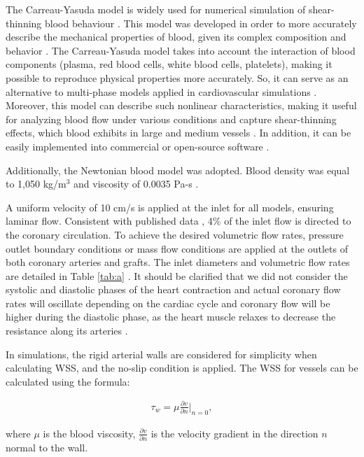 ﻿\documentclass[12pt,a4paper]{article}
\theoremstyle{definition}
\numberwithin{equation}{section}
\begin{document}
The Carreau-Yasuda model is widely used for numerical simulation of shear-thinning blood behaviour  \cite{80,81}. This model was developed in order to more accurately describe the mechanical properties of blood, given its complex composition and behavior \cite{82}. The Carreau-Yasuda model takes into account the interaction of blood components (plasma, red blood cells, white blood cells, platelets), making it possible to reproduce physical properties more accurately. So, it can serve as an alternative to multi-phase models applied in cardiovascular simulations \cite{83}. Moreover, this model can describe such nonlinear characteristics, making it useful for analyzing blood flow under various conditions \cite{84} and capture shear-thinning effects, which blood exhibits in large and medium vessels \cite{85,86}. In addition, it can be easily implemented into commercial or open-source software \cite{87}.

Additionally, the  Newtonian blood model was adopted. Blood density was equal to 1,050 kg/m$^3$ and viscosity of 0.0035 Pa-s \cite{9}. 

A uniform velocity of 10 cm/s is applied at the inlet for all models, ensuring laminar flow. Consistent with published data \cite{2}, 4\% of the inlet flow is directed to the coronary circulation. To achieve the desired volumetric flow rates, pressure outlet boundary conditions or mass flow conditions are applied at the outlets of both coronary arteries and grafts. The inlet diameters and volumetric flow rates are detailed in Table \ref{tab:a} \cite{3}. It should be clarified that we did not consider the systolic and diastolic phases of the heart contraction and actual coronary flow rates will oscillate depending on the cardiac cycle and coronary flow will be higher during the diastolic phase, as the heart muscle relaxes to decrease the resistance along its arteries \cite{70, 71}.

In simulations, the rigid arterial walls are considered for simplicity when calculating WSS, and the no-slip condition is applied. The WSS for vessels \cite{78} can be calculated using the formula:

\begin{align}
    \tau_w = \mu \frac{\partial v}{\partial n} \bigg|_{n=0},
\end{align}

    where \( \mu \) is the blood viscosity, \( \frac{\partial v}{\partial n} \) is the velocity gradient in the direction \(n\) normal to the wall.
\end{document}
